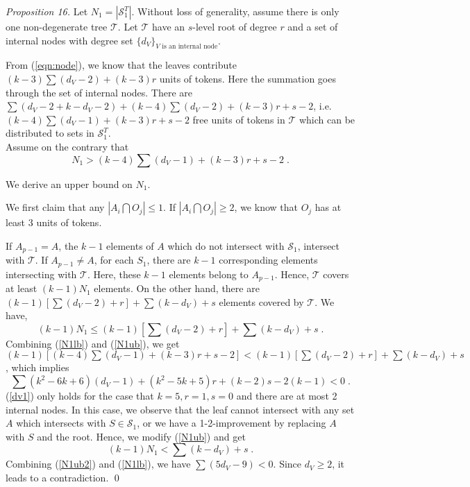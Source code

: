 \documentclass[runningheads,a4paper]{llncs}
\numberwithin{equation}{section}
\begin{document}
\begin{proof}[Proposition 16]
Let $N_1=|\mathscr{S}_1^T|$. Without loss of generality, assume there is only one non-degenerate tree $\mathscr{T}$. Let $\mathscr{T}$ have an $s$-level root of degree $r$ and a set of internal nodes with degree set $\{d_V\}_{V\textrm{ is an internal node}}$.

From (\ref{eqn:node}), we know that the leaves contribute $(k-3)\sum (d_V-2)+(k-3)r$ units of tokens. Here the summation goes through the set of internal nodes. There are $\sum (d_V-2+k-d_V-2)+(k-4)\sum (d_V-2)+(k-3)r+s-2$, i.e. $(k-4)\sum (d_V-1)+(k-3)r+s-2$ free units of tokens in $\mathscr{T}$ which can be distributed to sets in $\mathscr{S}_1^T$. \\
Assume on the contrary that
        \begin{equation}
        N_1>(k-4)\sum (d_V-1)+(k-3)r+s-2 \; .
        \label{N1lb}
        \end{equation}

        We derive an upper bound on $N_1$.

        We first claim that any $|A_i\bigcap O_j|\leq 1$. If $|A_i\bigcap O_j|\geq 2$, we know that $O_j$ has at least 3 units of tokens.

        If $A_{p-1}=A$, the $k-1$ elements of $A$ which do not intersect with $\mathscr{S}_1$, intersect with $\mathscr{T}$. If $A_{p-1}\neq A$, for each $S_1$, there are $k-1$ corresponding elements intersecting with $\mathscr{T}$. Here, these $k-1$ elements belong to $A_{p-1}$. Hence, $\mathscr{T}$ covers at least $(k-1)N_1$ elements. On the other hand, there are $(k-1)[\sum (d_V-2)+r]+\sum (k-d_V)+s$ elements covered by $\mathscr{T}$. We have,
        \begin{equation}
        (k-1)N_1\leq (k-1)[\sum (d_V-2)+r]+\sum (k-d_V)+s \; .
        \label{N1ub}
        \end{equation}
        Combining (\ref{N1lb}) and (\ref{N1ub}), we get $(k-1)[(k-4)\sum (d_V-1)+(k-3)r+s-2]<(k-1)[\sum (d_V-2)+r]+\sum (k-d_V)+s$, which implies
        \begin{equation}
        \sum (k^2-6k+6)(d_V-1)+(k^2-5k+5)r+(k-2)s-2(k-1)<0 \; .
        \label{dv1}
        \end{equation}
        (\ref{dv1}) only holds for the case that $k=5,r=1,s=0$ and there are at most 2 internal nodes. In this case, we observe that the leaf cannot intersect with any set $A$ which intersects with $S\in\mathscr{S}_1$, or we have a 1-2-improvement by replacing $A$ with $S$ and the root. Hence, we modify (\ref{N1ub}) and get
        \begin{equation}
        (k-1)N_1< \sum (k-d_V)+s \; .
        \label{N1ub2}
        \end{equation}
        Combining (\ref{N1ub2}) and (\ref{N1lb}), we have $\sum (5d_V-9)<0$. Since $d_V\geq 2$, it leads to a contradiction. \qed
\end{proof}
\end{document}
